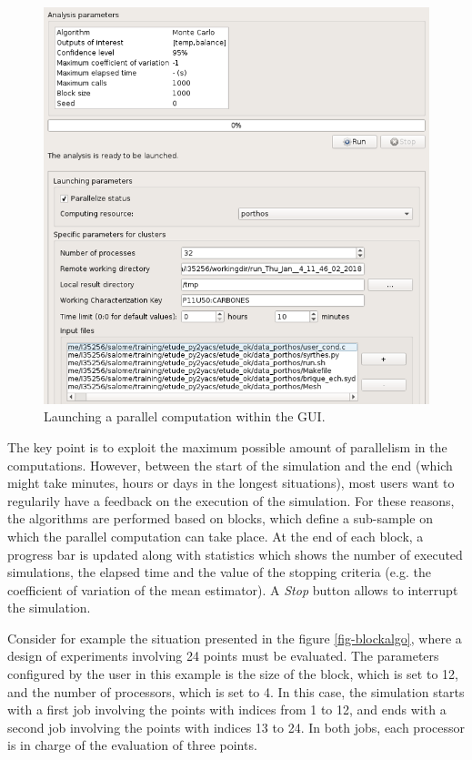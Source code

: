 \documentclass{article}
\begin{document}
\begin{figure}
\centering
\includegraphics[width=\textwidth]{figures/SALOME-OpenTURNS-config-HPC-focus.png}
\caption{Launching a parallel computation within the GUI.}
\label{fig-hpcsalome}
\end{figure}

The key point is to exploit the maximum possible amount of parallelism in 
the computations. 
However, between the start of the simulation and the end (which might take minutes, hours 
or days in the longest situations), most users want to regularily have a feedback on the 
execution of the simulation. 
For these reasons, the algorithms are performed based on blocks, which define a sub-sample 
on which the parallel computation can take place. 
At the end of each block, a progress bar is updated along with statistics which shows the 
number of executed simulations, the elapsed time and the value of the stopping criteria 
(e.g. the coefficient of variation of the mean estimator). 
A \emph{Stop} button allows to interrupt the simulation. 

Consider for example the situation presented in the figure \ref{fig-blockalgo}, 
where a design of experiments involving 24 points must be evaluated. 
The parameters configured by the user in this example is the size of the block, which is set 
to 12, and the number of processors, which is set to 4. 
In this case, the simulation starts with a first job involving the points with indices from 1 to 12, 
and ends with a second job involving the points with indices 13 to 24. 
In both jobs, each processor is in charge of the evaluation of three points. 
\end{document}
